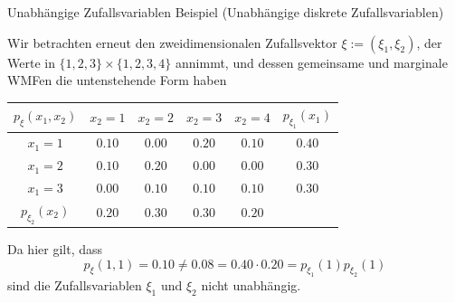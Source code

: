 \documentclass[
  8pt,
  ignorenonframetext,
]{beamer}
\begin{document}
\begin{frame}{Unabhängige Zufallsvariablen}
\protect\hypertarget{unabhuxe4ngige-zufallsvariablen-2}{}
Beispiel (Unabhängige diskrete Zufallsvariablen) \vspace{2mm}

\small

Wir betrachten erneut den zweidimensionalen Zufallsvektor
\(\xi:= (\xi_1, \xi_2)\), der Werte in \(\{1,2,3\} \times \{1,2,3,4\}\)
annimmt, und dessen gemeinsame und marginale WMFen die untenstehende
Form haben \vspace{1mm}

\begin{center}
\begin{tabular}{|c|cccc|c|}
\hline
$p_\xi(x_1,x_2)$    &   $x_2 = 1$   &   $x_2 = 2$   &   $x_2 = 3$   &   $x_2 = 4$   & $p_{\xi_1}(x_1)$  \\\hline
$x_1 = 1$           &   $0.10$      &   $0.00$      &   $0.20$      &   $0.10$      & $0.40$            \\
$x_1 = 2$           &   $0.10$      &   $0.20$      &   $0.00$      &   $0.00$      & $0.30$            \\
$x_1 = 3$           &   $0.00$      &   $0.10$      &   $0.10$      &   $0.10$      & $0.30$            \\\hline
$p_{\xi_2}(x_2)$    &   $0.20$      &   $0.30$      &   $0.30$      &   $0.20$      &                   \\\hline
\end{tabular}
\end{center}
\vspace{2mm}

Da hier gilt, dass \begin{equation}
p_\xi(1,1) = 0.10 \neq 0.08 = 0.40\cdot 0.20 =  p_{\xi_1}(1)p_{\xi_2}(1)
\end{equation} sind die Zufallsvariablen \(\xi_1\) und \(\xi_2\) nicht
unabhängig.
\end{frame}
\end{document}

